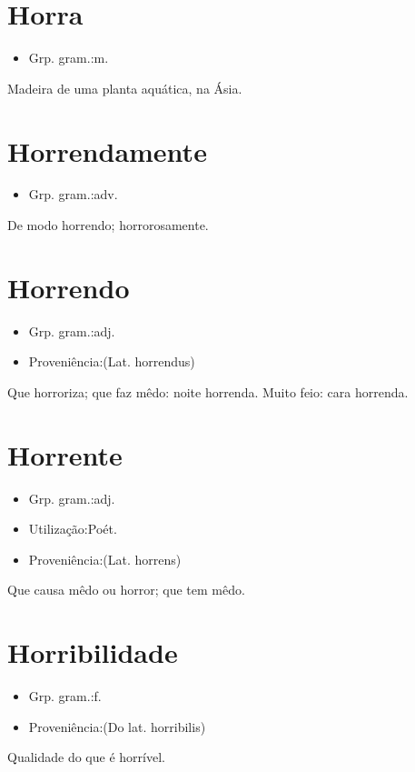 \documentclass{article}
\begin{document}
\section{Horra}
\begin{itemize}
\item {Grp. gram.:m.}
\end{itemize}
Madeira de uma planta aquática, na Ásia.
\section{Horrendamente}
\begin{itemize}
\item {Grp. gram.:adv.}
\end{itemize}
De modo horrendo; horrorosamente.
\section{Horrendo}
\begin{itemize}
\item {Grp. gram.:adj.}
\end{itemize}
\begin{itemize}
\item {Proveniência:(Lat. \textunderscore horrendus\textunderscore )}
\end{itemize}
Que horroriza; que faz mêdo: \textunderscore noite horrenda\textunderscore .
Muito feio: \textunderscore cara horrenda\textunderscore .
\section{Horrente}
\begin{itemize}
\item {Grp. gram.:adj.}
\end{itemize}
\begin{itemize}
\item {Utilização:Poét.}
\end{itemize}
\begin{itemize}
\item {Proveniência:(Lat. \textunderscore horrens\textunderscore )}
\end{itemize}
Que causa mêdo ou horror; que tem mêdo.
\section{Horribilidade}
\begin{itemize}
\item {Grp. gram.:f.}
\end{itemize}
\begin{itemize}
\item {Proveniência:(Do lat. \textunderscore horribilis\textunderscore )}
\end{itemize}
Qualidade do que é horrível.
\end{document}
